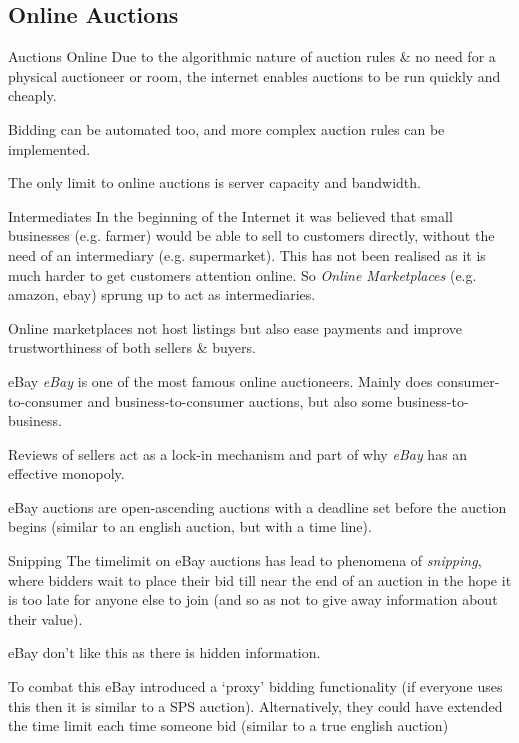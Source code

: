 \documentclass[11pt,a4paper]{article}
\begin{document}
\subsection{Online Auctions}

\begin{remark}{Auctions Online}
  Due to the algorithmic nature of auction rules \& no need for a physical auctioneer or room, the internet enables auctions to be run quickly and cheaply.
  \par Bidding can be automated too, and more complex auction rules can be implemented.
  \par The only limit to online auctions is server capacity and bandwidth.
\end{remark}

\begin{remark}{Intermediates}
  In the beginning of the Internet it was believed that small businesses (e.g. farmer) would be able to sell to customers directly, without the need of an intermediary (e.g. supermarket). This has not been realised as it is much harder to get customers attention online. So \textit{Online Marketplaces} (e.g. amazon, ebay) sprung up to act as intermediaries.
  \par Online marketplaces not host listings but also ease payments and improve trustworthiness of both sellers \& buyers.
\end{remark}

\begin{remark}{eBay}
  \textit{eBay} is one of the most famous online auctioneers. Mainly does consumer-to-consumer and business-to-consumer auctions, but also some business-to-business.
  \par Reviews of sellers act as a lock-in mechanism and part of why \textit{eBay} has an effective monopoly.
  \par eBay auctions are open-ascending auctions with a deadline set before the auction begins (similar to an english auction, but with a time line).
\end{remark}

\begin{remark}{Snipping}
  The timelimit on eBay auctions has lead to phenomena of \textit{snipping}, where bidders wait to place their bid till near the end of an auction in the hope it is too late for anyone else to join (and so as not to give away information about their value).
  \par eBay don't like this as there is hidden information.
  \par To combat this eBay introduced a `proxy' bidding functionality (if everyone uses this then it is similar to a SPS auction). Alternatively, they could have extended the time limit each time someone bid (similar to a true english auction)
\end{remark}
\end{document}
